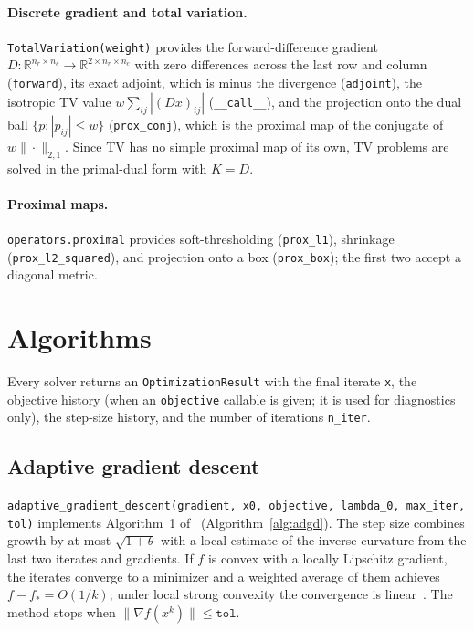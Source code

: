 \documentclass[11pt,a4paper]{article}
\newcommand{\code}[1]{\texttt{#1}}
\begin{document}
\paragraph{Discrete gradient and total variation.}
\code{TotalVariation(weight)} provides the forward-difference gradient
$D:\mathbb R^{n_r\times n_c}\to\mathbb R^{2\times n_r\times n_c}$ with zero
differences across the last row and column (\code{forward}), its exact
adjoint, which is minus the divergence (\code{adjoint}), the isotropic TV
value $w\sum_{ij}|(Dx)_{ij}|$ (\code{\_\_call\_\_}), and the projection onto
the dual ball $\{p:|p_{ij}|\le w\}$ (\code{prox\_conj}), which is the
proximal map of the conjugate of $w\|\cdot\|_{2,1}$. Since TV has no simple
proximal map of its own, TV problems are solved in the primal-dual form with
$K=D$.

\paragraph{Proximal maps.} \code{operators.proximal} provides
soft-thresholding (\code{prox\_l1}), shrinkage (\code{prox\_l2\_squared}),
and projection onto a box (\code{prox\_box}); the first two accept a
diagonal metric.

\section{Algorithms}\label{sec:algorithms}

Every solver returns an \code{OptimizationResult} with the final iterate
\code{x}, the objective history (when an \code{objective} callable is given;
it is used for diagnostics only), the step-size history, and the number of
iterations \code{n\_iter}.

\subsection{Adaptive gradient descent}

\code{adaptive\_gradient\_descent(gradient, x0, objective, lambda\_0,
max\_iter, tol)} implements Algorithm~1 of~\cite{MalitskyMishchenko2020}
(Algorithm~\ref{alg:adgd}). The step size combines growth by at most
$\sqrt{1+\theta}$ with a local estimate of the inverse curvature from the
last two iterates and gradients. If $f$ is convex with a locally Lipschitz
gradient, the iterates converge to a minimizer and a weighted average of
them achieves $f-f_*=O(1/k)$; under local strong convexity the convergence
is linear~\cite{MalitskyMishchenko2020}. The method stops when
$\|\nabla f(x^k)\|\le\code{tol}$.
\end{document}
